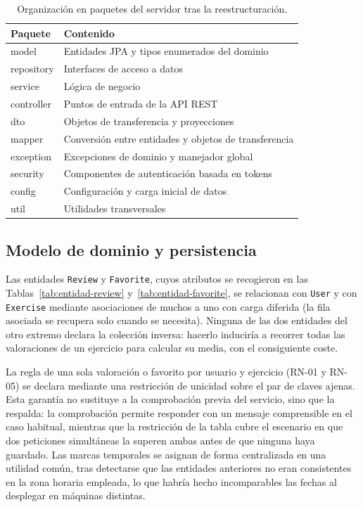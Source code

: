 \documentclass[12pt,a4paper,twoside,openright]{book}
\begin{document}
    \begin{table}[htbp]
        \centering
        \begin{tabular}{l p{8.5cm}}
            \toprule
            \textbf{Paquete} & \textbf{Contenido} \\
            \midrule
            model      & Entidades JPA y tipos enumerados del dominio \\
            repository & Interfaces de acceso a datos \\
            service    & Lógica de negocio \\
            controller & Puntos de entrada de la API REST \\
            dto        & Objetos de transferencia y proyecciones \\
            mapper     & Conversión entre entidades y objetos de transferencia \\
            exception  & Excepciones de dominio y manejador global \\
            security   & Componentes de autenticación basada en tokens \\
            config     & Configuración y carga inicial de datos \\
            util       & Utilidades transversales \\
            \bottomrule
        \end{tabular}
        \caption{Organización en paquetes del servidor tras la
        reestructuración.}
        \label{tab:paquetes}
    \end{table}

    \subsection{Modelo de dominio y persistencia}

    Las entidades \texttt{Review} y \texttt{Favorite}, cuyos atributos se
    recogieron en las Tablas~\ref{tab:entidad-review}
    y~\ref{tab:entidad-favorite}, se relacionan con \texttt{User} y con
    \texttt{Exercise} mediante asociaciones de muchos a uno con carga diferida
    (la fila asociada se recupera solo cuando se necesita). Ninguna de las dos
    entidades del otro extremo declara la colección inversa: hacerlo induciría a
    recorrer todas las valoraciones de un ejercicio para calcular su media, con
    el consiguiente coste.

    La regla de una sola valoración o favorito por usuario y ejercicio (RN-01 y
    RN-05) se declara mediante una restricción de unicidad sobre el par de claves
    ajenas. Esta garantía no sustituye a la comprobación previa del servicio,
    sino que la respalda: la comprobación permite responder con un mensaje
    comprensible en el caso habitual, mientras que la restricción de la tabla
    cubre el escenario en que dos peticiones simultáneas la superen ambas antes
    de que ninguna haya guardado. Las marcas temporales se asignan de forma
    centralizada en una utilidad común, tras detectarse que las entidades
    anteriores no eran consistentes en la zona horaria empleada, lo que habría
    hecho incomparables las fechas al desplegar en máquinas distintas.
\end{document}
